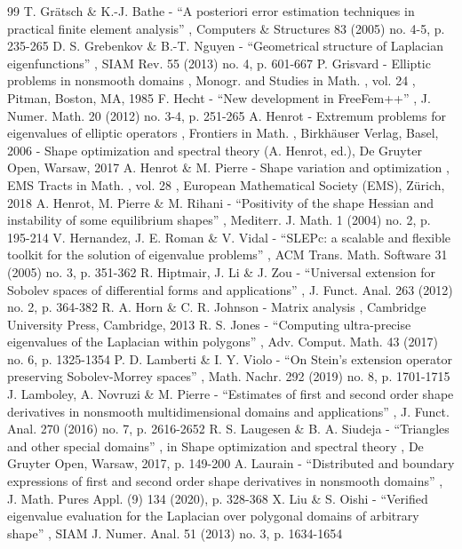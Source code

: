 \documentclass[11pt]{article}
\numberwithin{equation}{section}\newtheorem*{jepEnonce}{\jepEnonceTitle}\newenvironment{enonce*}[1]{\def\jepEnonceTitle{#1}\jepEnonce}{\endjepEnonce}\newtheorem*{conj*}{Conjecture}
\theoremstyle{plain}
\theoremstyle{definition}
\begin{document}
\begin{thebibliography}{99}
 T. Grätsch \& K.-J. Bathe - “A posteriori error estimation techniques in practical finite element analysis” , Computers \& Structures 83 (2005) no. 4-5, p. 235-265
 D. S. Grebenkov \& B.-T. Nguyen - “Geometrical structure of Laplacian eigenfunctions” , SIAM Rev. 55 (2013) no. 4, p. 601-667
 P. Grisvard - Elliptic problems in nonsmooth domains , Monogr. and Studies in Math. , vol. 24 , Pitman, Boston, MA, 1985
 F. Hecht - “New development in FreeFem++” , J. Numer. Math. 20 (2012) no. 3-4, p. 251-265
 A. Henrot - Extremum problems for eigenvalues of elliptic operators , Frontiers in Math. , Birkhäuser Verlag, Basel, 2006
 - Shape optimization and spectral theory (A. Henrot, ed.), De Gruyter Open, Warsaw, 2017
 A. Henrot \& M. Pierre - Shape variation and optimization , EMS Tracts in Math. , vol. 28 , European Mathematical Society (EMS), Zürich, 2018
 A. Henrot, M. Pierre \& M. Rihani - “Positivity of the shape Hessian and instability of some equilibrium shapes” , Mediterr. J. Math. 1 (2004) no. 2, p. 195-214
 V. Hernandez, J. E. Roman \& V. Vidal - “SLEPc: a scalable and flexible toolkit for the solution of eigenvalue problems” , ACM Trans. Math. Software 31 (2005) no. 3, p. 351-362
 R. Hiptmair, J. Li \& J. Zou - “Universal extension for Sobolev spaces of differential forms and applications” , J. Funct. Anal. 263 (2012) no. 2, p. 364-382
 R. A. Horn \& C. R. Johnson - Matrix analysis , Cambridge University Press, Cambridge, 2013
 R. S. Jones - “Computing ultra-precise eigenvalues of the Laplacian within polygons” , Adv. Comput. Math. 43 (2017) no. 6, p. 1325-1354
 P. D. Lamberti \& I. Y. Violo - “On Stein’s extension operator preserving Sobolev-Morrey spaces” , Math. Nachr. 292 (2019) no. 8, p. 1701-1715
 J. Lamboley, A. Novruzi \& M. Pierre - “Estimates of first and second order shape derivatives in nonsmooth multidimensional domains and applications” , J. Funct. Anal. 270 (2016) no. 7, p. 2616-2652
 R. S. Laugesen \& B. A. Siudeja - “Triangles and other special domains” , in Shape optimization and spectral theory , De Gruyter Open, Warsaw, 2017, p. 149-200
 A. Laurain - “Distributed and boundary expressions of first and second order shape derivatives in nonsmooth domains” , J. Math. Pures Appl. (9) 134 (2020), p. 328-368
 X. Liu \& S. Oishi - “Verified eigenvalue evaluation for the Laplacian over polygonal domains of arbitrary shape” , SIAM J. Numer. Anal. 51 (2013) no. 3, p. 1634-1654

\end{thebibliography}
\end{document}
